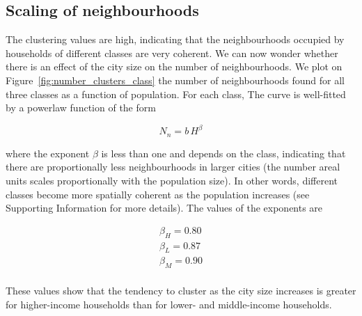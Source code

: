  \subsection{Scaling of neighbourhoods}
       \label{ssub:dependence_on_city_size}
       
The clustering values are high, indicating that the neighbourhoods occupied by
households of different classes are very coherent. We can now wonder whether
there is an effect of the city size on the number of neighbourhoods. We plot on
Figure~\ref{fig:number_clusters_class} the number of neighbourhoods found for all
three classes as a function of population. For each class, The curve is
well-fitted by a powerlaw function of the form

\begin{equation}
    N_n = b\,H^\beta
\end{equation}

where the exponent $\beta$ is less than one and depends on the class, 
indicating that there are proportionally less neighbourhoods
in larger cities (the number areal units scales proportionally with the
population size). In other words, different classes become more spatially
coherent as the population increases (see Supporting Information for more
details). The values of the exponents are

\begin{align*}
    \beta_{H} = 0.80\\
    \beta_{L} = 0.87\\
    \beta_{M} = 0.90\\
\end{align*}

These values show that the tendency to cluster as the city size increases is greater
for higher-income households than for lower- and middle-income households.\\




